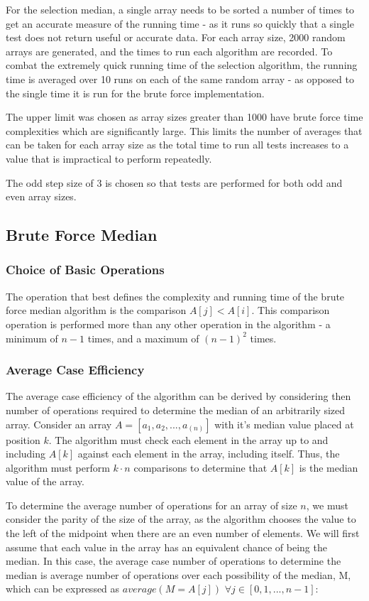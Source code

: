 \documentclass{article}
\begin{document}
        For the selection median, a single array needs to be sorted a number of times to get an accurate measure of the running time - as it runs so quickly that a single test does not return useful or accurate data. For each array size, 2000 random arrays are generated, and the times to run each algorithm are recorded. To combat the extremely quick running time of the selection algorithm, the running time is averaged over 10 runs on each of the same random array - as opposed to the single time it is run for the brute force implementation.

        The upper limit was chosen as array sizes greater than 1000 have brute force time complexities which are significantly large. This limits the number of averages that can be taken for each array size as the total time to run all tests increases to a value that is impractical to perform repeatedly. 

        The odd step size of 3 is chosen so that tests are performed for both odd and even array sizes.
    \subsection{Brute Force Median}
        \subsubsection{Choice of Basic Operations}
            The operation that best defines the complexity and running time of the brute force median algorithm is the comparison $A[j] < A[i]$. This comparison operation is performed more than any other operation in the algorithm - a minimum of $n - 1$ times, and a maximum of $(n - 1)^2$ times.

        \subsubsection{Average Case Efficiency}
            The average case efficiency of the algorithm can be derived by considering then number of operations required to determine the median of an arbitrarily sized array. Consider an array $A = [a_1, a_2, ..., a_(n)]$ with it's median value placed at position $k$. The algorithm must check each element in the array up to and including $A[k]$ against each element in the array, including itself. Thus, the algorithm must perform $k \cdot n$ comparisons to determine that $A[k]$ is the median value of the array.

            To determine the average number of operations for an array of size $n$, we must consider the parity of the size of the array, as the algorithm chooses the value to the left of the midpoint when there are an even number of elements. We will first assume that each value in the array has an equivalent chance of being the median. In this case, the average case number of operations to determine the median is average number of operations over each possibility of the median, M, which can be expressed as $average(M = A[j])$ $\forall j \in [0, 1, ..., n - 1]$:
\end{document}
